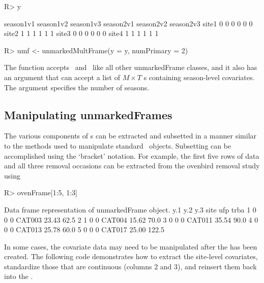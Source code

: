 \documentclass[article,shortnames]{jss}
\newcommand{\rlang}{\proglang{R}}
\newcommand{\scovs}{\code{siteCovs}}
\newcommand{\ocovs}{\code{obsCovs}}
\begin{document}
{\newpage

\begin{Schunk}
\begin{Sinput}
R> y
\end{Sinput}
\begin{Soutput}
      season1v1 season1v2 season1v3 season2v1 season2v2 season2v3
site1         0         0         0         0         0         0
site2         1         1         1         1         1         1
site3         0         0         0         0         0         0
site4         1         1         1         1         1         1
\end{Soutput}
\begin{Sinput}
R> umf <- unmarkedMultFrame(y = y, numPrimary = 2)
\end{Sinput}
\end{Schunk}

The function  accepts \scovs\ and \ocovs\ like all
other unmarkedFrame classes, and it also has an argument 
that can accept a list of $M \times T$ s containing
season-level covariates. The  argument specifies the
number of seasons.

\subsection{Manipulating unmarkedFrames}
\label{sec:manip}

The various components of s can be extracted and
subsetted in a manner similar to the methods used to manipulate standard
\rlang\ objects.  Subsetting can be accomplished using the `bracket'
notation. For example, the first five rows of data and all three
removal occasions can be extracted from the ovenbird removal study using

\begin{Schunk}
\begin{Sinput}
R> ovenFrame[1:5, 1:3]
\end{Sinput}
\begin{Soutput}
Data frame representation of unmarkedFrame object.
  y.1 y.2 y.3   site   ufp  trba
1   0   0   0 CAT003 23.43  62.5
2   1   0   0 CAT004 15.62  70.0
3   0   0   0 CAT011 35.54  90.0
4   0   0   0 CAT013 25.78  60.0
5   0   0   0 CAT017 25.00 122.5
\end{Soutput}
\end{Schunk}

In some cases, the covariate data may need to be manipulated after the
 has been created. The following code demonstrates
how to extract the site-level covariates, standardize those that are
continuous (columns 2 and 3), and reinsert them back into the
.

}
\end{document}

